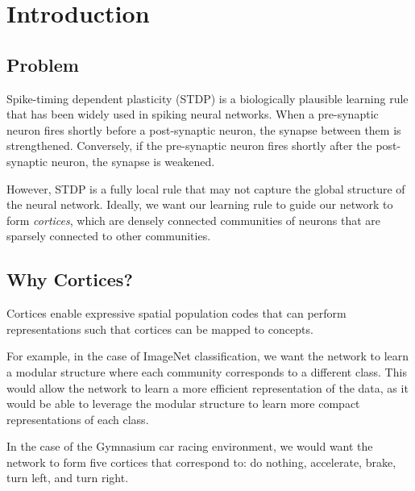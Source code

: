 \documentclass[pdflatex,sn-mathphys-num]{sn-jnl}%
\theoremstyle{thmstyleone}%
\theoremstyle{thmstyletwo}%
\theoremstyle{thmstylethree}%
\begin{document}



\maketitle

\section{Introduction}\label{sec1}

\subsection{Problem}
Spike-timing dependent plasticity (STDP) \cite{Shouval2010-uj} is a biologically plausible learning rule that has been widely used in spiking neural networks. When a pre-synaptic neuron fires shortly before a post-synaptic neuron, the synapse between them is strengthened. Conversely, if the pre-synaptic neuron fires shortly after the post-synaptic neuron, the synapse is weakened.

However, STDP is a fully local rule that may not capture the global structure of the neural network. Ideally, we want our learning rule to guide our network to form \emph{cortices}, which are densely connected communities of neurons that are sparsely connected to other communities.

\subsection{Why Cortices?}

Cortices enable expressive spatial population codes that can perform representations such that cortices can be mapped to concepts.

For example, in the case of ImageNet classification, we want the network to learn a modular structure where each community corresponds to a different class. This would allow the network to learn a more efficient representation of the data, as it would be able to leverage the modular structure to learn more compact representations of each class.

In the case of the Gymnasium car racing environment, we would want the network to form five cortices that correspond to: do nothing, accelerate, brake, turn left, and turn right.
\end{document}
